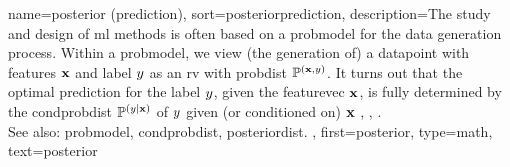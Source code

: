 {name={posterior (prediction)},
sort={posteriorprediction},
	description={The study and design of \gls{ml} methods is often based on a 
         	\gls{probmodel} for the \gls{data} generation process. Within a 
		\gls{probmodel}, we view (the generation of) a \gls{datapoint} with 
		\glspl{feature} ${\bf x}$ and \gls{label} $y$ as an 
		\gls{rv} with \gls{probdist} $\mathbb{P}^{({\bf x},y)}$. 
		It turns out that the optimal \gls{prediction} for the \gls{label} 
		$y$, given the \gls{featurevec} ${\bf x}$, is fully 
		determined by the \gls{condprobdist} $\mathbb{P}^{(y \mid {\bf x})}$
		of $y$ given (or conditioned on) ${\bf x}$ \cite{BishopBook}, \cite{papoulis}, \cite{LC}.
		\\
		See also: \gls{probmodel}, \gls{condprobdist}, \gls{posteriordist}. }, 
 	first={posterior}, 
 	type=math, 
 	text={posterior} 
}

